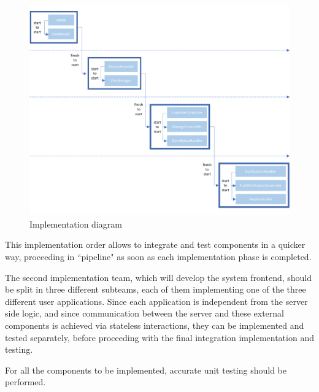 \documentclass[a4paper,oneside,11pt]{book}
\begin{document}
    \begin{figure}[H]
            \centering
            \includegraphics[width=.9\textwidth, height=\textheight, keepaspectratio]{pictures/implementation_diagram}
            \caption{Implementation diagram}
            \label{figure:implementation_diagram}
        \end{figure}
    This implementation order allows to integrate and test components in a quicker way, proceeding in ``pipeline" as soon as each implementation phase is completed. \par 
    The second implementation team, which will develop the system frontend, should be split in three different subteams, each of them implementing one of the three different user applications. Since each application is independent from the server side logic, and since communication between the server and these external components is achieved via stateless interactions, they can be implemented and tested separately, before proceeding with the final integration implementation and testing. \par
    For all the components to be implemented, accurate unit testing should be performed.
    
\end{document}
